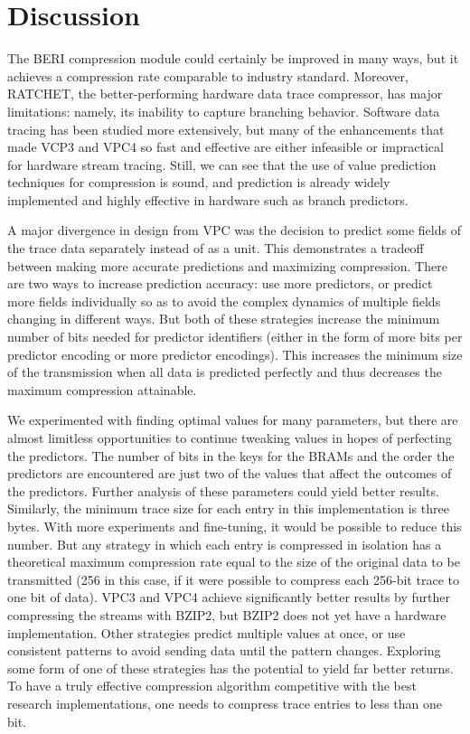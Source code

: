 \documentclass[conference]{IEEEtran}
\begin{document}
\section{Discussion}


The BERI compression module could certainly be improved in many ways, but it achieves a compression rate comparable to industry standard. Moreover, RATCHET, the better-performing hardware data trace compressor, has major limitations: namely, its inability to capture branching behavior. Software data tracing has been studied more extensively, but many of the enhancements that made VCP3 and VPC4 so fast and effective are either infeasible or impractical for hardware stream tracing. Still, we can see that the use of value prediction techniques for compression is sound, and prediction is already widely implemented and highly effective in hardware such as branch predictors.  

A major divergence in design from VPC was the decision to predict some fields of the trace data separately instead of as a unit. This demonstrates a tradeoff between making more accurate predictions and maximizing compression. There are two ways to increase prediction accuracy: use more predictors, or predict more fields individually so as to avoid the complex dynamics of multiple fields changing in different ways. But both of these strategies increase the minimum number of bits needed for predictor identifiers (either in the form of more bits per predictor encoding or more predictor encodings). This increases the minimum size of the transmission when all data is predicted perfectly and thus decreases the maximum compression attainable. 
 
We experimented with finding optimal values for many parameters, but there are almost limitless opportunities to continue tweaking values in hopes of perfecting the predictors. The number of bits in the keys for the BRAMs and the order the predictors are encountered are just two of the values that affect the outcomes of the predictors. Further analysis of these parameters could yield better results. Similarly, the minimum trace size for each entry in this implementation is three bytes. With more experiments and fine-tuning, it would be possible to reduce this number. But any strategy in which each entry is compressed in isolation has a theoretical maximum compression rate equal to the size of the original data to be transmitted (256 in this case, if it were possible to compress each 256-bit trace to one bit of data). VPC3 and VPC4 achieve significantly better results by further compressing the streams with BZIP2, but BZIP2 does not yet have a hardware implementation. Other strategies predict multiple values at once, or use consistent patterns to avoid sending data until the pattern changes. Exploring some form of one of these strategies has the potential to yield far better returns. To have a truly effective compression algorithm competitive with the best research implementations, one needs to compress trace entries to less than one bit.
\end{document}
